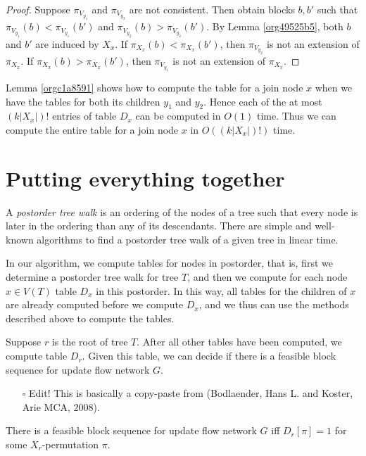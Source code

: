 \documentclass[fontsize=11pt,paper=a4]{book}
\begin{document}
\begin{proof}
Suppose \(\pi_{V_{y_1}}\) and \(\pi_{V_{y_2}}\) are not consistent.
Then obtain blocks \(b,b'\) such that \(\pi_{V_{y_1}}(b)<\pi_{V_{y_1}}(b')\) and \(\pi_{V_{y_2}}(b)>\pi_{V_{y_2}}(b')\).
By Lemma \ref{org49525b5}, both \(b\) and \(b'\) are induced by \(X_x\).
If \(\pi_{X_x}(b)<\pi_{X_x}(b')\), then \(\pi_{V_{y_2}}\) is not an extension of \(\pi_{X_x}\).
If \(\pi_{X_x}(b)>\pi_{X_x}(b')\), then \(\pi_{V_{y_1}}\) is not an extension of \(\pi_{X_x}\).
\end{proof}

Lemma \ref{orgc1a8591} shows how to compute the table for a join node \(x\) when we have the tables for both its children \(y_1\) and \(y_2\).
Hence each of the at most \((k\lvert X_x\rvert)!\) entries of table \(D_x\) can be computed in \(O(1)\) time.
Thus we can compute the entire table for a join node \(x\) in \(O((k\lvert X_x\rvert)!)\) time.

\section{Putting everything together}
\label{sec:orgca9bea6}

A \emph{postorder tree walk} is an ordering of the nodes of a tree such that every node is later in the ordering than any of its descendants.
There are simple and well-known algorithms to find a postorder tree walk of a given tree in linear time.

In our algorithm, we compute tables for nodes in postorder, that is, first we determine a postorder tree walk for tree \(T\), and then we compute for each node \(x\in V(T)\) table \(D_x\) in this postorder.
In this way, all tables for the children of \(x\) are already computed before we compute \(D_x\), and we thus can use the methods described above to compute the tables.

Suppose \(r\) is the root of tree \(T\).
After all other tables have been computed, we compute table \(D_r\).
Given this table, we can decide if there is a feasible block sequence for update flow network \(G\).

\begin{itemize}
\item[{$\square$}] Edit! This is basically a copy-paste from (Bodlaender, Hans L. and Koster, Arie MCA, 2008).
\end{itemize}

\begin{lem}
There is a feasible block sequence for update flow network \(G\) iff \(D_r[\pi]=1\) for some \(X_r\)-permutation \(\pi\).
\label{org1b0fd90}
\end{lem}
\end{document}
